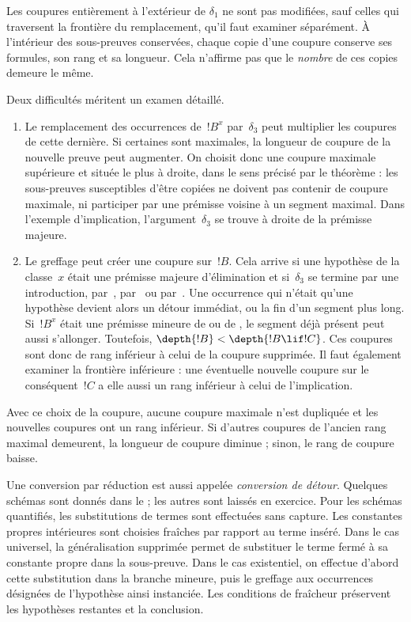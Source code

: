 \documentclass[../../../include/open-logic-section]{subfiles}
\begin{document}
Les coupures entièrement à l'extérieur de
$\delta_1$ ne sont pas modifiées, sauf celles
qui traversent la frontière du remplacement,
qu'il faut examiner séparément.
À l'intérieur des sous-preuves conservées,
chaque copie d'une coupure conserve ses
formules, son rang et sa longueur.
Cela n'affirme pas que le \emph{nombre} de
ces copies demeure le même.

Deux difficultés méritent un examen détaillé.
\begin{enumerate}
  \item Le remplacement des occurrences
  de~$!B^x$ par~$\delta_3$ peut multiplier
  les coupures de cette dernière. Si certaines
  sont maximales, la longueur de coupure
  de la nouvelle preuve peut augmenter.
  On choisit donc une coupure maximale
  supérieure et située le plus à droite,
  dans le sens précisé par le théorème :
  les sous-preuves susceptibles d'être
  copiées ne doivent pas contenir de
  coupure maximale, ni participer par
  une prémisse voisine à un segment
  maximal. Dans l'exemple d'implication,
  l'argument~$\delta_3$ se trouve à
  droite de la prémisse majeure.

  \item Le greffage peut créer une coupure
  sur~$!B$. Cela arrive si une hypothèse
  de la classe~$x$ était une prémisse
  majeure d'élimination et si~$\delta_3$
  se termine par une introduction,
  par~\FalseInt, par~\Elim{\lor} ou
  par~\Elim{\lexists}. Une occurrence
  qui n'était qu'une hypothèse devient
  alors un détour immédiat, ou la fin
  d'un segment plus long. Si~$!B^x$
  était une prémisse mineure de
  \Elim{\lor} ou de \Elim{\lexists},
  le segment déjà présent peut aussi
  s'allonger. Toutefois,
  $\depth{!B} < \depth{!B \lif !C}$.
  Ces coupures sont donc de rang
  inférieur à celui de la coupure
  supprimée. Il faut également examiner
  la frontière inférieure : une
  éventuelle nouvelle coupure sur le
  conséquent~$!C$ a elle aussi un rang
  inférieur à celui de l'implication.
\end{enumerate}

Avec ce choix de la coupure, aucune coupure
maximale n'est dupliquée et les nouvelles
coupures ont un rang inférieur. Si d'autres
coupures de l'ancien rang maximal demeurent,
la longueur de coupure diminue ; sinon,
le rang de coupure baisse.

Une conversion par réduction est aussi appelée
\emph{conversion de détour}.
Quelques schémas sont donnés dans le
 ;
les autres sont laissés en exercice.
Pour les schémas quantifiés, les substitutions
de termes sont effectuées sans capture.
Les constantes propres intérieures sont
choisies fraîches par rapport au terme inséré.
Dans le cas universel, la généralisation
supprimée permet de substituer le terme
fermé à sa constante propre dans la
sous-preuve. Dans le cas existentiel, on
effectue d'abord cette substitution dans
la branche mineure, puis le greffage aux
occurrences désignées de l'hypothèse ainsi
instanciée. Les conditions de fraîcheur
préservent les hypothèses restantes et
la conclusion.
\end{document}
